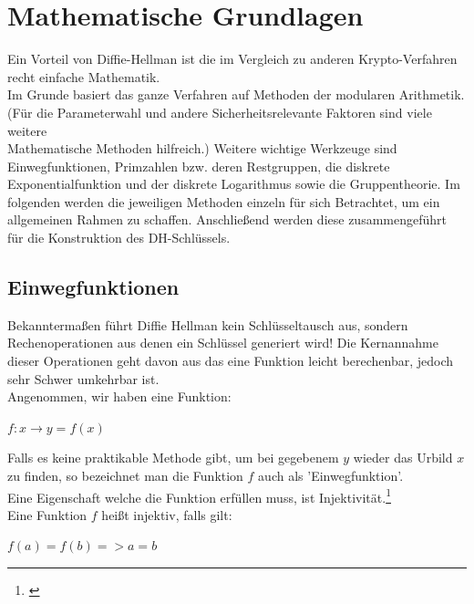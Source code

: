 \documentclass[a4paper,12pt]{scrartcl}
\begin{document}
\newpage

\section{Mathematische Grundlagen}
Ein Vorteil von Diffie-Hellman ist die im Vergleich zu anderen Krypto-Verfahren recht einfache Mathematik. \\
Im Grunde basiert das ganze Verfahren auf Methoden der modularen Arithmetik. \\
(Für die Parameterwahl und andere Sicherheitsrelevante Faktoren sind viele weitere\\ Mathematische Methoden hilfreich.)
Weitere wichtige Werkzeuge sind Einwegfunktionen, Primzahlen bzw. deren Restgruppen, die diskrete Exponentialfunktion und der diskrete Logarithmus sowie die Gruppentheorie. Im folgenden werden  die jeweiligen Methoden einzeln für sich Betrachtet, um ein allgemeinen Rahmen zu schaffen. Anschließend werden diese zusammengeführt für die Konstruktion des DH-Schlüssels.

\subsection{Einwegfunktionen}

Bekanntermaßen führt Diffie Hellman kein Schlüsseltausch aus, sondern  Rechenoperationen aus denen ein Schlüssel generiert wird!
Die Kernannahme dieser Operationen geht davon aus das eine Funktion leicht berechenbar, jedoch sehr Schwer umkehrbar ist.\\
Angenommen, wir haben eine Funktion:
 
                               \begin{center}
                               $f: x \rightarrow y = f(x)$ 
                               \end{center}
                               
                               Falls es keine praktikable Methode gibt, um bei gegebenem $y$ wieder das Urbild $x$ zu finden, so bezeichnet man die Funktion $f$ auch als 'Einwegfunktion'.\\ Eine Eigenschaft welche die Funktion erfüllen muss, ist Injektivität.\footnote{\cite{Lenze2020}}\\
Eine Funktion $f$ heißt injektiv, falls gilt:\\

							\begin{center}
							 $f(a) = f(b) => a = b$ \\

							\end{center}
\end{document}
